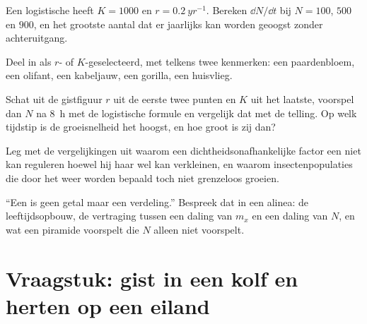\begin{exercise}[$\star\star$]\label{exo:b1:populations:8}
Een logistische  heeft $K = 1000$ en $r = \qty{0.2}{yr^{-1}}$.
Bereken $\dd N/\dd t$ bij $N = 100$, $500$ en $900$, en het grootste aantal
dat er jaarlijks kan worden geoogst zonder achteruitgang.
\end{exercise}

\begin{exercise}[$\star\star$]\label{exo:b1:populations:9}
Deel in als $r$- of $K$-geselecteerd, met telkens twee kenmerken: een
paardenbloem, een olifant, een kabeljauw, een gorilla, een huisvlieg.
\end{exercise}

\begin{exercise}[$\star\star\star$]\label{exo:b1:populations:10}
Schat uit de gistfiguur $r$ uit de eerste twee punten en $K$ uit het
laatste, voorspel dan $N$ na \qty{8}{h} met de logistische formule en
vergelijk dat met de telling. Op welk tijdstip is de groeisnelheid het
hoogst, en hoe groot is zij dan?
\end{exercise}

\begin{exercise}[$\star\star\star$]\label{exo:b1:populations:11}
Leg met de vergelijkingen uit waarom een dichtheidsonafhankelijke factor
een  niet kan reguleren hoewel hij haar wel kan verkleinen, en
waarom insectenpopulaties die door het weer worden bepaald toch niet
grenzeloos groeien.
\end{exercise}

\begin{exercise}[$\star\star\star$]\label{exo:b1:populations:12}
``Een  is geen getal maar een verdeling.'' Bespreek dat in een
alinea: de leeftijdsopbouw, de vertraging tussen een daling van $m_x$ en een
daling van $N$, en wat een piramide voorspelt die $N$ alleen niet voorspelt.
\end{exercise}

\section{Vraagstuk: gist in een kolf en herten op een eiland}

